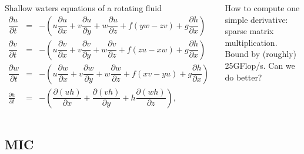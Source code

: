 \documentclass{beamer}
\begin{document}
\begin{frame}
\begin{columns}
    \begin{block}{Shallow waters equations of a rotating fluid}
      \tiny
      \begin{eqnarray}
        \dfrac{\partial u}{\partial t} &=& - \left( u\dfrac{\partial u}{\partial x} + v\dfrac{\partial u}{\partial y} + w\dfrac{\partial u}{\partial z} + f(yw - zv) + g\dfrac{\partial h}{\partial x} \right) 
        \nonumber \\
        \dfrac{\partial v}{\partial t} &=& - \left( u\dfrac{\partial v}{\partial x} + v\dfrac{\partial v}{\partial y} + w\dfrac{\partial v}{\partial z} + f(zu - xw) + g\dfrac{\partial h}{\partial x} \right)
        \nonumber\\
        \dfrac{\partial w}{\partial t} &=& - \left( u\dfrac{\partial w}{\partial x} + v\dfrac{\partial w}{\partial y} + w\dfrac{\partial w}{\partial z} + f(xv - yu) + g\dfrac{\partial h}{\partial x} \right)
        \nonumber\\
        \frac{\partial h}{\partial t}& =&-\left(\dfrac{\partial (uh)}{\partial x} + \dfrac{\partial (vh)}{\partial y} + h\dfrac{\partial (wh)}{\partial z}\right) , \label{height} \nonumber
      \end{eqnarray}
    \end{block}

    How to compute one simple derivative: sparse matrix
    multiplication. Bound by (roughly) 25GFlop/s. Can we do better?
  \end{columns}
\end{frame}


\subsection{MIC}

  
\end{document}
